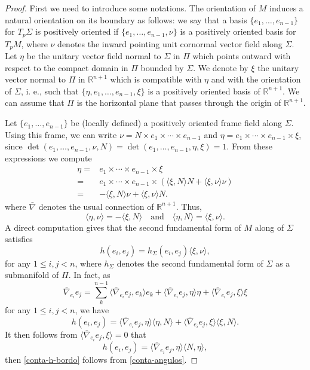\documentclass[11pt]{amsart}
\theoremstyle{plain}
\numberwithin{equation}{section}
\numberwithin{theorem}{section}
\begin{document}
\begin{proof}
 First we need to introduce some notations. The orientation of $M$ induces a natural orientation on its boundary as follows: we say that a basis $\{e_1, \ldots, e_{n-1}\}$ for $T_p\Sigma$ is positively oriented if $\{e_1, \ldots, e_{n-1}, \nu\}$ is a positively oriented basis for $T_pM$,  where $\nu$ denotes the inward pointing unit cornormal vector field along $\Sigma$. Let $\eta$  be the unitary vector field normal to $\Sigma$ in $\Pi$ which points outward with respect to the compact domain in $\Pi$ bounded by $\Sigma$. We denote by $\xi$ the unitary vector  normal to $\Pi$  in $\mathbb{R}^{n+1}$ which is compatible with $\eta$ and with the orientation of $\Sigma$, i. e., such that $\{\eta, e_1, \ldots, e_{n-1},\xi\}$ is a positively oriented basis of $\mathbb{R}^{n+1}$. We can assume that $\Pi$ is the horizontal plane that passes through the origin of $\mathbb{R}^{n+1}$.

Let $\{e_1, \ldots, e_{n-1}\}$ be (locally defined) a positively oriented frame field along $\Sigma$. Using this frame, we can write $\nu = N\times e_1\times\cdots\times e_{n-1} $ and $\eta= e_1\times\cdots\times e_{n-1} \times\xi$, since $\det( e_1, \dots, e_{n-1},\nu,  N)=\det( e_1, \dots, e_{n-1}, \eta, \xi)=1.$ From these expressions we compute
\begin{align*}
\eta =& e_1\times\cdots\times e_{n-1} \times \xi \\ =& e_1\times\cdots\times e_{n-1} \times (\langle\xi, N\rangle N+\langle \xi, \nu\rangle \nu)\\ =& -\langle\xi, N\rangle \nu+\langle \xi, \nu\rangle N.
\end{align*}
where   $\bar\nabla$ denotes  the usual connection of $\mathbb{R}^{n+1}$. 
Thus,
\begin{equation}
		\label{conta-angulos}
\langle \eta ,\nu\rangle=-\langle \xi, N\rangle \quad \textrm{and}\quad \langle \eta , N\rangle=\langle \xi, \nu\rangle.
\end{equation}
A direct computation gives that the second fundamental form of $M$ along of $\Sigma$ satisfies
\begin{equation}
	\label{conta-h-bordo}
h(e_i,e_j)=  h_{\Sigma} (e_i,e_j)\langle \xi, \nu\rangle,
\end{equation}
for any $1\leq i,j<n$, where $h_\Sigma$ denotes the second fundamental form of $\Sigma$ as a submanifold of $\Pi$. In fact,  as
\[
\bar \nabla_{e_i}e_j=\sum_k^{n-1}\langle \bar \nabla_{e_i}e_j, e_k\rangle e_k+\langle\bar \nabla_{e_i}e_j, \eta\rangle \eta+\langle\bar \nabla_{e_i}e_j, \xi\rangle \xi
\]
for any $1\leq i,j<n$, we have
\[
h(e_i, e_j)=\langle\bar \nabla_{e_i}e_j, \eta\rangle\langle\eta,N\rangle + \langle \bar \nabla_{e_i}e_j, \xi \rangle \langle\xi, N\rangle.
\]
It then follows from $\langle \bar\nabla_{e_i}e_j, \xi \rangle =0$ that
\[
h(e_i,e_j)=\langle \bar \nabla_{e_i}e_j, \eta\rangle  \langle N,\eta\rangle,
\]
then \eqref{conta-h-bordo} follows from \eqref{conta-angulos}.


\end{proof}
\end{document}
